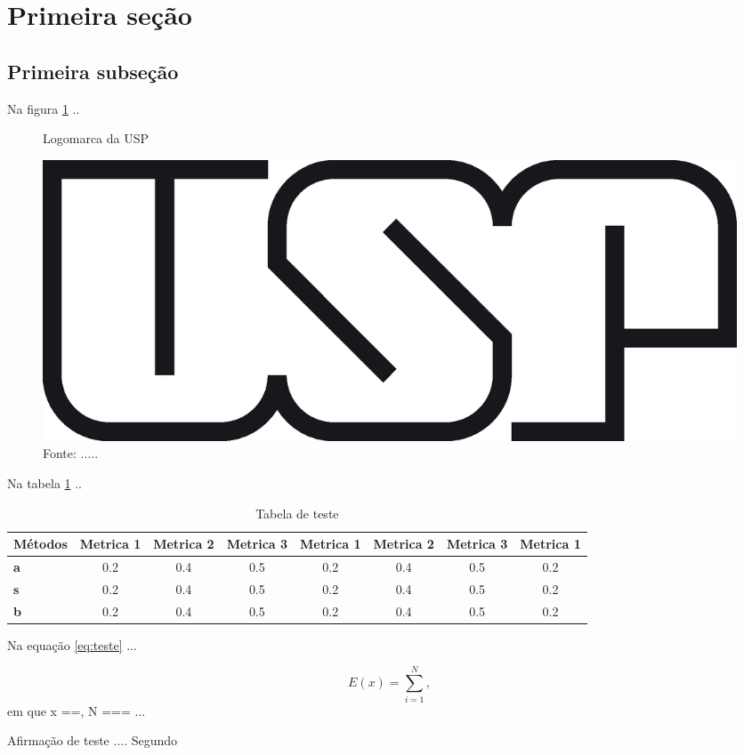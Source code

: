 \section{Primeira seção}

\subsection{Primeira subseção}

Na figura \ref{fig:teste} ..

\begin{figure}[!htb]
		\caption{Logomarca da USP}
		\label{fig:teste}
		\centering
		\includegraphics[width=0.3\columnwidth]{images/usp-logo}
		\caption*{Fonte: .....}
\end{figure}

Na tabela \ref{tab:teste} ..

\begin{table}[!htb]
\centering
\fontsize{8.4pt}{8.4pt}\selectfont
\def\arraystretch{2}
\addtolength{\tabcolsep}{-1pt} 
\caption{Tabela de teste}
\begin{tabular}{@{}lccccccc@{}}
\toprule
\textbf{Métodos} & \textbf{Metrica 1} & \textbf{Metrica 2} & \textbf{Metrica 3} & \textbf{Metrica 1} & \textbf{Metrica 2} & \textbf{Metrica 3} & \textbf{Metrica 1} \\ \midrule
\textbf{a}       & 0.2                & 0.4                & 0.5                & 0.2                & 0.4                & 0.5                & 0.2                \\
\textbf{s}       & 0.2                & 0.4                & 0.5                & 0.2                & 0.4                & 0.5                & 0.2                \\
\textbf{b}       & 0.2                & 0.4                & 0.5                & 0.2                & 0.4                & 0.5                & 0.2                \\ \bottomrule
\end{tabular}
\label{tab:teste}
\end{table}

Na equação \ref{eq:teste} ... 

\begin{equation} \label{eq:teste}
    E(x) = \sum_{i = 1}^{N}, 
\end{equation}
\noindent em que x ==, N === ... 

Afirmação de teste \cite{perera2019learning} .... Segundo 